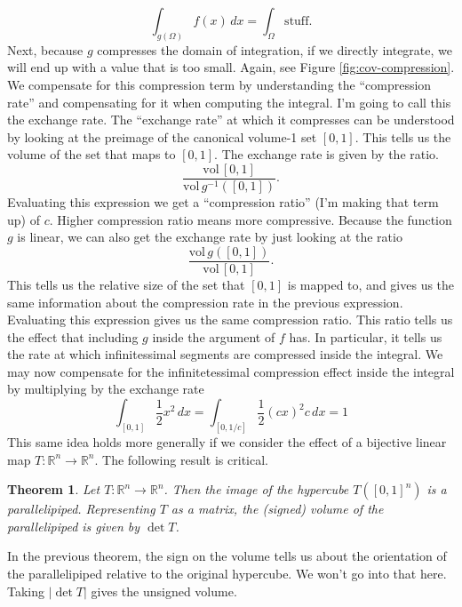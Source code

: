 \documentclass{book}
\newtheorem{theorem}{Theorem}
\newcommand{\dx}{\, dx}
\newcommand{\R}{\mathbb{R}}
\begin{document}
$$
\int_{g(\Omega)} f(x)\dx = \int_{\Omega} \mbox{stuff}.
$$
Next, because $g$ compresses the domain of integration, if we directly integrate, we will end up with a value that is too small. Again, see Figure \ref{fig:cov-compression}. We compensate for this compression term by understanding the ``compression rate'' and compensating for it when computing the integral. I'm going to call this the exchange rate. The ``exchange rate'' at which it compresses can be understood by looking at the preimage of the canonical volume-1 set $[0,1]$. This tells us the volume of the set that maps to $[0,1]$. The exchange rate is given by the ratio. 
$$
\frac{\mbox{vol}\, [0,1]}{\mbox{vol} \, g^{-1}([0, 1])}.
$$
Evaluating this expression we get a ``compression ratio'' (I'm making that term up) of $c$. Higher compression ratio means more compressive. 
Because the function $g$ is linear, we can also get the exchange rate by just looking at the ratio
$$
\frac{\mbox{vol} \, g([0, 1])}{\mbox{vol}\, [0,1]}.
$$
This tells us the relative size of the set that $[0,1]$ is mapped to, and gives us the same information about the compression rate in the previous expression. Evaluating this expression gives us the same compression ratio. This ratio tells us the effect that including $g$ inside the argument of $f$ has. In particular, it tells us the rate at which infinitessimal segments are compressed inside the integral. We may now compensate for the infinitetessimal compression effect inside the integral by multiplying by the exchange rate
$$
\int_{[0,1]} \frac{1}{2} x^2 \dx = \int_{[0,1/c]} \frac{1}{2} (cx)^2  c\dx = 1
$$
This same idea holds more generally if we consider the effect of a bijective linear map $T:\R^n\to\R^n$. The following result is critical. 
\begin{theorem}
Let $T:\R^n\to\R^n$. Then the image of the hypercube $T([0, 1]^n)$ is a parallelipiped. Representing $T$ as a matrix, the (signed) volume of the parallelipiped is given by $\det T$. 
\end{theorem}
In the previous theorem, the sign on the volume tells us about the orientation of the parallelipiped relative to the original hypercube. We won't go into that here. Taking $|\det T|$ gives the unsigned volume. 
\end{document}
